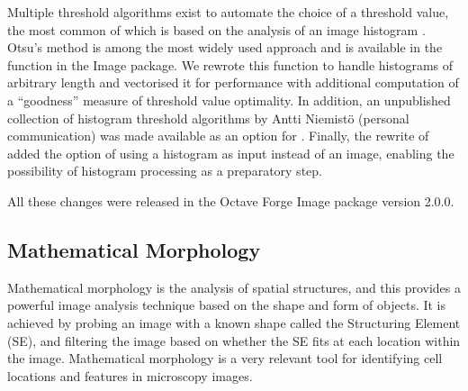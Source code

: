 Multiple threshold algorithms exist to automate the choice of a
threshold value, the most common of which is based on the analysis
of an image histogram \citep{analysis-hist-threshold}.  Otsu's method
\citep{otsu-threshold} is among the most widely used approach
and is available in the function  in the Image
package.  We rewrote this function to handle histograms of arbitrary
length and vectorised it for performance with additional computation of a
``goodness'' measure of threshold value optimality.
In addition, an unpublished collection of histogram
threshold algorithms by Antti Niemistö (personal communication)
was made available as an
option for .  Finally, the rewrite
of  added the
option of using a histogram as input instead of an image, enabling
the possibility of histogram processing as a preparatory step.


All these changes were released in the Octave Forge Image
package version 2.0.0.

\subsection{Mathematical Morphology}

Mathematical morphology is the analysis of spatial
structures, and this provides a powerful image analysis technique based on
the shape and form of objects.  It is achieved by probing an image
with a known shape called the Structuring Element (SE), and filtering the
image based on whether the SE fits at each location
within the image.
Mathematical morphology is a very relevant tool for identifying cell
locations and features in microscopy images.

